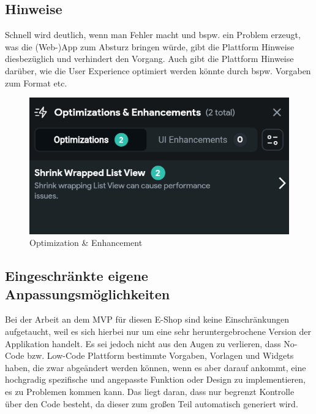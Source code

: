 \documentclass[acmtog, language=ngerman]{acmart}
\begin{document}
\subsection{Hinweise}
Schnell wird deutlich, wenn man Fehler macht und bspw. ein Problem erzeugt, was die (Web-)App zum Absturz bringen würde, gibt die Plattform Hinweise diesbezüglich und verhindert den Vorgang. Auch gibt die Plattform Hinweise darüber, wie die User Experience optimiert werden könnte durch bspw. Vorgaben zum Format etc.
\begin{figure}[h]
    \centering
    \includegraphics[width=1\linewidth]{images/FF_optimization.png}
    \caption{Optimization \& Enhancement}
    \label{fig:enter-label}
\end{figure}

\subsection{Eingeschränkte eigene Anpassungsmöglichkeiten}
Bei der Arbeit an dem MVP für diesen E-Shop sind keine Einschränkungen aufgetaucht, weil es sich hierbei nur um eine sehr heruntergebrochene Version der Applikation handelt. Es sei jedoch nicht aus den Augen zu verlieren, dass No-Code bzw. Low-Code Plattform bestimmte Vorgaben, Vorlagen und Widgets haben, die zwar abgeändert werden können, wenn es aber darauf ankommt, eine hochgradig spezifische und angepasste Funktion oder Design zu implementieren, es zu Problemen kommen kann. Das liegt daran, dass nur begrenzt Kontrolle über den Code besteht, da dieser zum großen Teil automatisch generiert wird.
\end{document}
